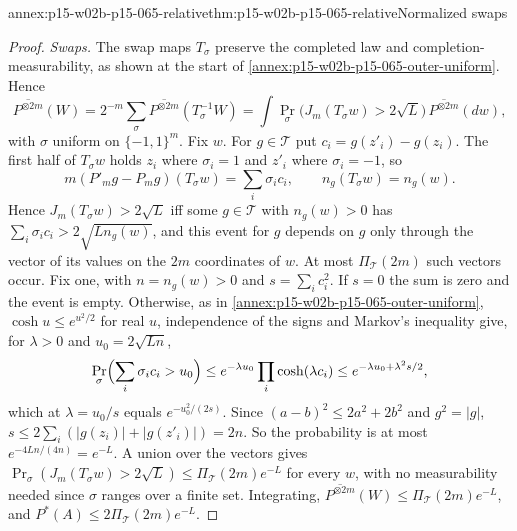 \begin{annexitem}{annex:p15-w02b-p15-065-relative}{thm:p15-w02b-p15-065-relative}{Normalized swaps}
\begin{proof}
\emph{Swaps.} The swap maps \(T_\sigma\) preserve the completed law and
completion-measurability, as shown at the start of
\cref{annex:p15-w02b-p15-065-outer-uniform}. Hence
\[
 \overline{P^{\otimes2m}}(W)=2^{-m}\sum_\sigma\overline{P^{\otimes2m}}(T_\sigma^{-1}W)
 =\int\Pr_\sigma\bigl(J_m(T_\sigma w)>2\sqrt L\bigr)\,\overline{P^{\otimes2m}}(dw),
\]
with \(\sigma\) uniform on \(\{-1,1\}^m\). Fix \(w\). For \(g\in\mathcal T\)
put \(c_i=g(z'_i)-g(z_i)\). The first half of \(T_\sigma w\) holds \(z_i\)
where \(\sigma_i=1\) and \(z'_i\) where \(\sigma_i=-1\), so
\[
 m(P'_mg-P_mg)(T_\sigma w)=\sum_i\sigma_ic_i,\qquad n_g(T_\sigma w)=n_g(w).
\]
Hence \(J_m(T_\sigma w)>2\sqrt L\) iff some \(g\in\mathcal T\) with
\(n_g(w)>0\) has \(\sum_i\sigma_ic_i>2\sqrt{Ln_g(w)}\), and this event for
\(g\) depends on \(g\) only through the vector of its values on the
\(2m\) coordinates of \(w\). At most \(\Pi_{\mathcal T}(2m)\) such vectors
occur. Fix one, with \(n=n_g(w)>0\) and \(s=\sum_ic_i^2\). If \(s=0\) the
sum is zero and the event is empty. Otherwise, as in
\cref{annex:p15-w02b-p15-065-outer-uniform}, \(\cosh u\leq e^{u^2/2}\) for
real \(u\), independence of the signs and Markov's inequality give, for
\(\lambda>0\) and \(u_0=2\sqrt{Ln}\),
\[
 \Pr_\sigma\Bigl(\sum_i\sigma_ic_i>u_0\Bigr)\leq e^{-\lambda u_0}\prod_i\cosh(\lambda c_i)
 \leq e^{-\lambda u_0+\lambda^2s/2},
\]
which at \(\lambda=u_0/s\) equals \(e^{-u_0^2/(2s)}\). Since
\((a-b)^2\leq2a^2+2b^2\) and \(g^2=|g|\),
\(s\leq2\sum_i(|g(z_i)|+|g(z'_i)|)=2n\). So the probability is at most
\(e^{-4Ln/(4n)}=e^{-L}\). A union over the vectors gives
\(\Pr_\sigma(J_m(T_\sigma w)>2\sqrt L)\leq\Pi_{\mathcal T}(2m)e^{-L}\) for
every \(w\), with no measurability needed since \(\sigma\) ranges over a
finite set. Integrating, \(\overline{P^{\otimes2m}}(W)\leq\Pi_{\mathcal T}(2m)e^{-L}\),
and \(P^{*}(A)\leq2\Pi_{\mathcal T}(2m)e^{-L}\).
\end{proof}
\end{annexitem}


